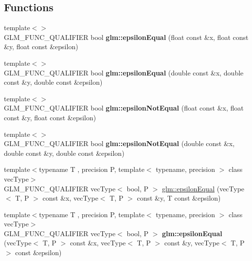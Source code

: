 \subsection*{Functions}
\begin{DoxyCompactItemize}
\item 
\mbox{\label{epsilon_8inl_aded5e7ea9a0eacd03367ad77986c2a15}} 
{\footnotesize template$<$$>$ }\\G\+L\+M\+\_\+\+F\+U\+N\+C\+\_\+\+Q\+U\+A\+L\+I\+F\+I\+ER bool {\bfseries glm\+::epsilon\+Equal} (float const \&x, float const \&y, float const \&epsilon)
\item 
\mbox{\label{epsilon_8inl_a6e30ea38a0e3ebc25d87e667255057e5}} 
{\footnotesize template$<$$>$ }\\G\+L\+M\+\_\+\+F\+U\+N\+C\+\_\+\+Q\+U\+A\+L\+I\+F\+I\+ER bool {\bfseries glm\+::epsilon\+Equal} (double const \&x, double const \&y, double const \&epsilon)
\item 
\mbox{\label{epsilon_8inl_af4127d65f4afc6e447d461bae25f90fe}} 
{\footnotesize template$<$$>$ }\\G\+L\+M\+\_\+\+F\+U\+N\+C\+\_\+\+Q\+U\+A\+L\+I\+F\+I\+ER bool {\bfseries glm\+::epsilon\+Not\+Equal} (float const \&x, float const \&y, float const \&epsilon)
\item 
\mbox{\label{epsilon_8inl_a68d8ce38812c8599018e404afc79f088}} 
{\footnotesize template$<$$>$ }\\G\+L\+M\+\_\+\+F\+U\+N\+C\+\_\+\+Q\+U\+A\+L\+I\+F\+I\+ER bool {\bfseries glm\+::epsilon\+Not\+Equal} (double const \&x, double const \&y, double const \&epsilon)
\item 
{\footnotesize template$<$typename T , precision P, template$<$ typename, precision $>$ class vec\+Type$>$ }\\G\+L\+M\+\_\+\+F\+U\+N\+C\+\_\+\+Q\+U\+A\+L\+I\+F\+I\+ER vec\+Type$<$ bool, P $>$ \hyperlink{group__gtc__epsilon_gaca9443f217dc36587624247245522331}{glm\+::epsilon\+Equal} (vec\+Type$<$ T, P $>$ const \&x, vec\+Type$<$ T, P $>$ const \&y, T const \&epsilon)
\item 
\mbox{\label{epsilon_8inl_abc7f87cb473f9c9d7d6109e96c139807}} 
{\footnotesize template$<$typename T , precision P, template$<$ typename, precision $>$ class vec\+Type$>$ }\\G\+L\+M\+\_\+\+F\+U\+N\+C\+\_\+\+Q\+U\+A\+L\+I\+F\+I\+ER vec\+Type$<$ bool, P $>$ {\bfseries glm\+::epsilon\+Equal} (vec\+Type$<$ T, P $>$ const \&x, vec\+Type$<$ T, P $>$ const \&y, vec\+Type$<$ T, P $>$ const \&epsilon)

\end{DoxyCompactItemize}
